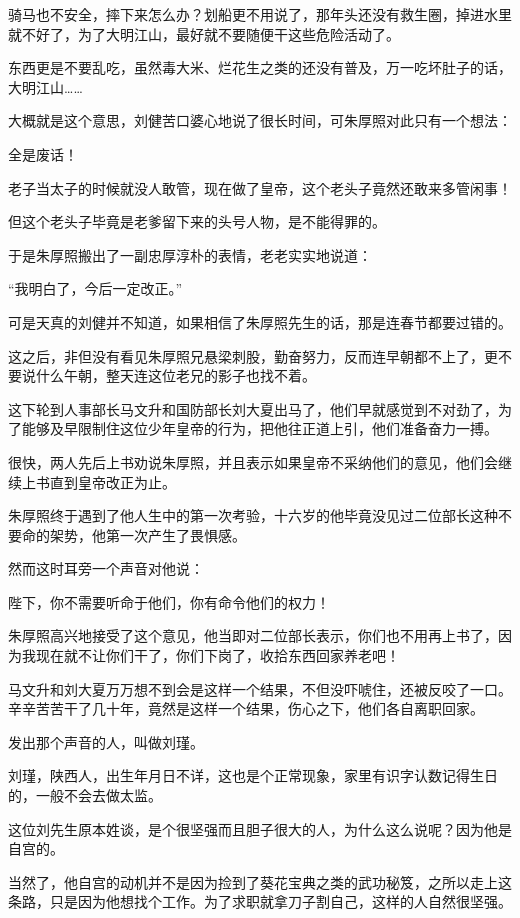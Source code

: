 \begin{multicols}{\theparacolNo}
		骑马也不安全，摔下来怎么办？划船更不用说了，那年头还没有救生圈，掉进水里就不好了，为了大明江山，最好就不要随便干这些危险活动了。

		东西更是不要乱吃，虽然毒大米、烂花生之类的还没有普及，万一吃坏肚子的话，大明江山……

		大概就是这个意思，刘健苦口婆心地说了很长时间，可朱厚照对此只有一个想法：

		全是废话！

		老子当太子的时候就没人敢管，现在做了皇帝，这个老头子竟然还敢来多管闲事！

		但这个老头子毕竟是老爹留下来的头号人物，是不能得罪的。

		于是朱厚照搬出了一副忠厚淳朴的表情，老老实实地说道：

		“我明白了，今后一定改正。”

		可是天真的刘健并不知道，如果相信了朱厚照先生的话，那是连春节都要过错的。

		这之后，非但没有看见朱厚照兄悬梁刺股，勤奋努力，反而连早朝都不上了，更不要说什么午朝，整天连这位老兄的影子也找不着。

		这下轮到人事部长马文升和国防部长刘大夏出马了，他们早就感觉到不对劲了，为了能够及早限制住这位少年皇帝的行为，把他往正道上引，他们准备奋力一搏。

		很快，两人先后上书劝说朱厚照，并且表示如果皇帝不采纳他们的意见，他们会继续上书直到皇帝改正为止。

		朱厚照终于遇到了他人生中的第一次考验，十六岁的他毕竟没见过二位部长这种不要命的架势，他第一次产生了畏惧感。

		然而这时耳旁一个声音对他说：

		陛下，你不需要听命于他们，你有命令他们的权力！

		朱厚照高兴地接受了这个意见，他当即对二位部长表示，你们也不用再上书了，因为我现在就不让你们干了，你们下岗了，收拾东西回家养老吧！

		马文升和刘大夏万万想不到会是这样一个结果，不但没吓唬住，还被反咬了一口。辛辛苦苦干了几十年，竟然是这样一个结果，伤心之下，他们各自离职回家。

		发出那个声音的人，叫做刘瑾。

		刘瑾，陕西人，出生年月日不详，这也是个正常现象，家里有识字认数记得生日的，一般不会去做太监。

		这位刘先生原本姓谈，是个很坚强而且胆子很大的人，为什么这么说呢？因为他是自宫的。

		当然了，他自宫的动机并不是因为捡到了葵花宝典之类的武功秘笈，之所以走上这条路，只是因为他想找个工作。为了求职就拿刀子割自己，这样的人自然很坚强。


\end{multicols}
